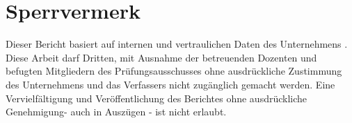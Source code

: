
\chapter*{Sperrvermerk}

\begin{justify}
Dieser Bericht basiert auf internen und vertraulichen Daten des Unternehmens \firma.
Diese Arbeit darf Dritten, mit Ausnahme der betreuenden Dozenten und befugten Mitgliedern des Prüfungsausschusses
ohne ausdrückliche Zustimmung des Unternehmens und das Verfassers nicht zugänglich gemacht werden.
Eine Vervielfältigung und Veröffentlichung des Berichtes ohne ausdrückliche Genehmigung- auch in Auszügen - ist nicht erlaubt.
\end{justify}